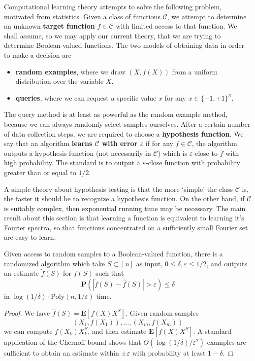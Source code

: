 Computational learning theory attempts to solve the following problem, motivated from statistics. Given a class of functions $\mathcal{C}$, we attempt to determine an unknown {\bf target function} $f \in \mathcal{C}$ with limited access to that function. We shall assume, so we may apply our current theory, that we are trying to determine Boolean-valued functions. The two models of obtaining data in order to make a decision are
%
\begin{itemize}
    \item {\bf random examples}, where we draw $(X,f(X))$ from a uniform distribution over the variable $X$.
    \item {\bf queries}, where we can request a specific value $x$ for any $x \in \{ -1, +1 \}^n$.
\end{itemize}
%
The query method is at least as powerful as the random example method, because we can always randomly select samples ourselves. After a certain number of data collection steps, we are required to choose a {\bf hypothesis function}. We say that an algorithm {\bf learns $\mathcal{C}$ with error $\varepsilon$} if for any $f \in \mathcal{C}$, the algorithm outputs a hypothesis function (not necessarily in $\mathcal{C}$) which is $\varepsilon$-close to $f$ with high probability. The standard is to output a $\varepsilon$-close function with probability greater than or equal to $1/2$.

A simple theory about hypothesis testing is that the more `simple' the class $\mathcal{C}$ is, the faster it should be to recognize a hypothesis function. On the other hand, if $\mathcal{C}$ is suitably complex, then exponential running time may be necessary. The main result about this section is that learning a function is equivalent to learning it's Fourier spectra, so that functions concentrated on a sufficiently small Fourier set are easy to learn.

\begin{theorem}
    Given access to random samples to a Boolean-valued function, there is a randomized algorithm which take $S \subset [n]$ as input, $0 \leq \delta, \varepsilon \leq 1/2$, and outputs an estimate $\widetilde{f}(S)$ for $\widehat{f}(S)$ such that
    \[ \mathbf{P}(|\widetilde{f}(S) - \widehat{f}(S)| > \varepsilon) \leq \delta \]
    in $\log(1/\delta) \cdot \text{Poly}(n, 1/\varepsilon)$ time.
\end{theorem}
\begin{proof}
    We have $\widehat{f}(S) = \mathbf{E}[f(X) X^S]$. Given random samples
    \[ (X_1, f(X_1)), \dots, (X_m, f(X_m)) \]
    we can compute $f(X_k)X_k^S$, and then estimate $\mathbf{E}[f(X) X^S]$. A standard application of the Chernoff bound shows that $O(\log(1/\delta)/\varepsilon^2)$ examples are sufficient to obtain an estimate within $\pm \varepsilon$ with probability at least $1 - \delta$.
\end{proof}

